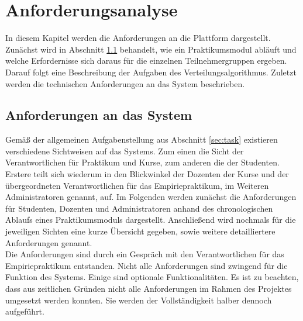 \chapter{Anforderungsanalyse}
\label{chapter:requirements}    

	In diesem Kapitel werden die Anforderungen an die Plattform dargestellt.
	Zunächst wird in Abschnitt \ref{sec:systemrequirements} behandelt, wie ein Praktikumsmodul abläuft und welche Erfordernisse sich daraus für die einzelnen Teilnehmergruppen ergeben.
	Darauf folgt eine Beschreibung der Aufgaben des Verteilungsalgorithmus.
	Zuletzt werden die technischen Anforderungen an das System beschrieben.
	
	\section{Anforderungen an das System}
		\label{sec:systemrequirements}
		Gemäß der allgemeinen Aufgabenstellung aus Abschnitt \ref{sec:task} existieren verschiedene Sichtweisen auf das Systems.
		Zum einen die Sicht der Verantwortlichen für Praktikum und Kurse, zum anderen die der Studenten.
		Erstere teilt sich wiederum in den Blickwinkel der Dozenten der Kurse und der übergeordneten Verantwortlichen für das Empiriepraktikum, im Weiteren Administratoren genannt, auf.
		Im Folgenden werden zunächst die Anforderungen für Studenten, Dozenten und Administratoren anhand des chronologischen Ablaufs eines Praktikumsmoduls dargestellt.
		Anschließend wird nochmals für die jeweiligen Sichten eine kurze Übersicht gegeben, sowie weitere detailliertere Anforderungen genannt.\\
		
		Die Anforderungen sind durch ein Gespräch mit den Verantwortlichen für das Empiriepraktikum entstanden. 
		Nicht alle Anforderungen sind zwingend für die Funktion des Systems.
		Einige sind optionale Funktionalitäten.
		Es ist zu beachten, dass aus zeitlichen Gründen nicht alle Anforderungen im Rahmen des Projektes umgesetzt werden konnten.
		Sie werden der Vollständigkeit halber dennoch aufgeführt.
		
